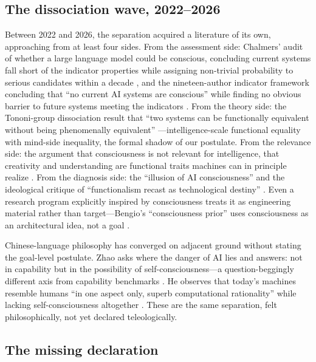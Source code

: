\documentclass[10pt]{article}
\begin{document}
\subsection{The dissociation wave, 2022--2026}\label{sec:genealogywave}

Between 2022 and 2026, the separation acquired a literature of its own, approaching from at least four sides. From the assessment side: Chalmers' audit of whether a large language model could be conscious, concluding current systems fall short of the indicator properties while assigning non-trivial probability to serious candidates within a decade \cite{chalmers2023llm}, and the nineteen-author indicator framework concluding that ``no current AI systems are conscious'' while finding no obvious barrier to future systems meeting the indicators \cite{butlin2023consciousness}. From the theory side: the Tononi-group dissociation result that ``two systems can be functionally equivalent without being phenomenally equivalent'' \cite{findlay2024dissociating}---intelligence-scale functional equality with mind-side inequality, the formal shadow of our postulate. From the relevance side: the argument that consciousness is not relevant for intelligence, that creativity and understanding are functional traits machines can in principle realize \cite{pesonen2026notobstacles}. From the diagnosis side: the ``illusion of AI consciousness'' \cite{elmoznino2025illusions} and the ideological critique of ``functionalism recast as technological destiny'' \cite{jorge2026harsh}. Even a research program explicitly inspired by consciousness treats it as engineering material rather than target---Bengio's ``consciousness prior'' uses consciousness as an architectural idea, not a goal \cite{bengio2017consciousness}.

Chinese-language philosophy has converged on adjacent ground without stating the goal-level postulate. Zhao asks where the danger of AI lies and answers: not in capability but in the possibility of self-consciousness---a question-beggingly different axis from capability benchmarks \cite{zhao2019selfconsciousness}. He observes that today's machines resemble humans ``in one aspect only, superb computational rationality'' while lacking self-consciousness altogether \cite{he2022what}. These are the same separation, felt philosophically, not yet declared teleologically.

\subsection{The missing declaration}\label{sec:genealogydeclaration}
\end{document}
